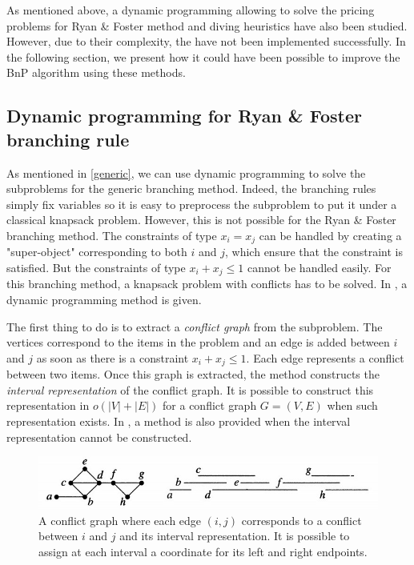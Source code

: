As mentioned above, a dynamic programming allowing to solve the pricing problems for Ryan \& Foster method and diving heuristics have also been studied. However, due to their complexity, the have not been implemented successfully. In the following section, we present how it could have been possible to improve the BnP algorithm using these methods.

\subsection{Dynamic programming for Ryan \& Foster branching rule}
\label{dynamic_rf}

As mentioned in \ref{generic}, we can use dynamic programming to solve the subproblems for the generic branching method. Indeed, the branching rules simply fix variables so it is easy to preprocess the subproblem to put it under a classical knapsack problem. However, this is not possible for the Ryan \& Foster branching method. The constraints of type $x_i = x_j$ can be handled by creating a "super-object" corresponding to both $i$ and $j$, which ensure that the constraint is satisfied. But the constraints of type $x_i + x_j \leq 1$ cannot be handled easily. For this branching method, a knapsack problem with conflicts has to be solved. In \cite{sadykov2013bin}, a dynamic programming method is given.

The first thing to do is to extract a \textit{conflict graph} from the subproblem. The vertices correspond to the items in the problem and an edge is added between $i$ and $j$ as soon as there is a constraint $x_i + x_j \leq 1$. Each edge represents a conflict between two items. Once this graph is extracted, the method constructs the \textit{interval representation} of the conflict graph. It is possible to construct this representation in $o(|V| + |E|)$ \cite{corneil1998ultimate} for a conflict graph $G=(V,E)$ when such representation exists. In \cite{sadykov2013bin}, a method is also provided when the interval representation cannot be constructed.

\begin{figure}[!ht]
	\centering
	\includegraphics[width=0.8\linewidth]{img/conflict-graph.jpg}
	\caption{A conflict graph where each edge $(i,j)$ corresponds to a conflict between $i$ and $j$ and its interval representation. It is possible to assign at each interval a coordinate for its left and right endpoints.}
\end{figure}

